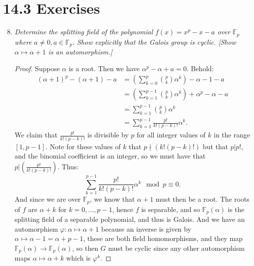 \documentclass[10pt,oneside,reqno]{amsart}
\theoremstyle{plain}
\theoremstyle{definition}
\theoremstyle{remark}
\theoremstyle{plain}
\newcommand{\F}{\mathbb{F}}
\newcommand{\bee}{\begin{equation}\begin{aligned}}
\newcommand{\eee}{\end{aligned}\end{equation}}
\newcommand{\fracc}{\frac}
\newcommand{\lpar}{\left(}
\newcommand{\rpar}{\right)}
\newcommand{\counter}{\setcounter}
\renewcommand{\phi}{\varphi}
\begin{document}
\section*{14.3 Exercises}

\begin{enumerate}[label=\arabic*.]
\counter{enumi}{7}

\item \textit{Determine the splitting field of the polynomial $f(x) = x^p - x - a$ over $\F_p$ where $a \neq 0,a \in \F_p$. Show explicitly that the Galois group is cyclic. [Show $\alpha \mapsto \alpha + 1$ is an automorphism.]}

\begin{proof}
Suppose $\alpha$ is a root. Then we have $\alpha^p - \alpha + a = 0$. Behold: 
\bee
(\alpha + 1)^p - (\alpha + 1) - a &= \lpar\sum_{k = 0}^p \binom{p}{k}\alpha^k\rpar - \alpha - 1 - a\\
&= \lpar \sum_{k = 1}^{p - 1} \binom{p}{k}\alpha^k \rpar + \alpha^p - \alpha - a\\
&= \sum_{k = 1}^{p - 1} \binom{p}{k}\alpha^k \\
&= \sum_{k = 1}^{p - 1} \fracc{p!}{k!(p - k)!}\alpha^k.
\eee
We claim that $\fracc{p!}{k!(p - k)!}$ is divisible by $p$ for all integer values of $k$ in the range $[1,p - 1]$. Note for these values of $k$ that $p\nmid (k!(p - k)!)$ but that $p|p!$, and the binomial coefficient is an integer, so we must have that $p|\lpar \fracc{p!}{k!(p - k)!} \rpar $. Thus: 
$$
\sum_{k = 1}^{p - 1} \fracc{p!}{k!(p - k)!}\alpha^k \mod p \equiv 0.
$$
And since we are over $\F_p$, we know that $\alpha + 1$ must then be a root. The roots of $f$ are $\alpha + k$ for $k = 0,...,p - 1$, hence $f$ is separable, and so $\F_p(\alpha)$ is the splitting field of a separable polynomial, and thus is Galois. And we have an automorphism $\phi:\alpha \mapsto \alpha + 1$ because an inverse is given by $\alpha \mapsto \alpha - 1 = \alpha + p - 1$, these are both field homomorphisms, and they map $\F_p(\alpha) \to \F_p(\alpha)$, so then $G$ must be cyclic since any other automorphism maps $\alpha \mapsto \alpha + k$ which is $\phi^k$. 
\end{proof}
\end{enumerate}
\end{document}
